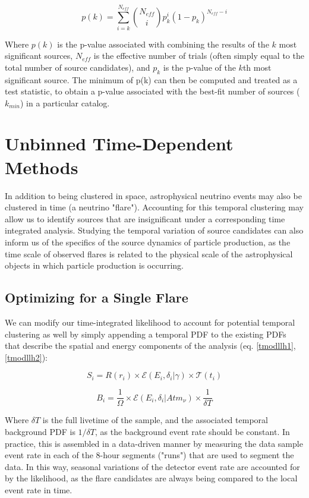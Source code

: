 \begin{equation}
    p(k) = \sum_{i=k}^{N_{eff}} \binom{N_{eff}}{i}p_k^i(1-p_k)^{N_{eff}-i}
    \label{bitest}
\end{equation}

Where $p(k)$ is the p-value associated with combining the results of the $k$ most significant sources, $N_{eff}$ is the effective number of trials (often simply equal to the total number of source candidates), and $p_k$ is the p-value of the $k$th most significant source. The minimum of p(k) can then be computed and treated as a test statistic, to obtain a p-value associated with the best-fit number of sources ($k_{min}$) in a particular catalog. 


\section{Unbinned Time-Dependent Methods}
In addition to being clustered in space, astrophysical neutrino events may also be clustered in time (a neutrino "flare"). Accounting for this temporal clustering may allow us to identify sources that are insignificant under a corresponding time integrated analysis. Studying the temporal variation of source candidates can also inform us of the specifics of the source dynamics of particle production, as the time scale of observed flares is related to the physical scale of the astrophysical objects in which particle production is occurring. 

\subsection{Optimizing for a Single Flare}
We can modify our time-integrated likelihood to account for potential temporal clustering as well by simply appending a temporal PDF to the existing PDFs that describe the spatial and energy components of the analysis (eq. \ref{tmodllh1}, \ref{tmodllh2}):

\begin{equation}
    S_i = R(r_i) \times \mathcal{E}(E_i, \delta_i|\gamma) \times \mathcal{T}(t_i)
    \label{tmodllh1}
\end{equation}

\begin{equation}
    B_i = \frac{1}{\Omega}\times \mathcal{E}(E_i,\delta_i|Atm_{\nu}) \times \frac{1}{\delta T}
    \label{tmodllh2}
\end{equation}

Where $\delta T$ is the full livetime of the sample, and the associated temporal background PDF is $1/\delta T$, as the background event rate should be constant. In practice, this is assembled in a data-driven manner by measuring the data sample event rate in each of the 8-hour segments ("runs") that are used to segment the data. In this way, seasonal variations of the detector event rate are accounted for by the likelihood, as the flare candidates are always being compared to the local event rate in time.

